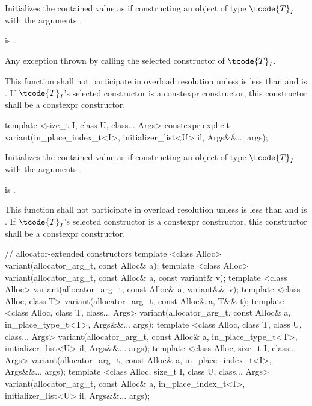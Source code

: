 \begin{itemdescr}
\pnum
\effects
Initializes the contained value as if constructing an object of type $\tcode{T}_I$
with the arguments .

\pnum
\postconditions
{} is .

\pnum
\throws
Any exception thrown by calling the selected constructor of $\tcode{T}_I$.

\pnum
\remarks
This function shall not participate in overload resolution unless  is
less than  and  is .
If $\tcode{T}_I$'s selected constructor is a constexpr constructor, this
constructor shall be a constexpr constructor.
\end{itemdescr}

%
\begin{itemdecl}
template <size_t I, class U, class... Args>
  constexpr explicit variant(in_place_index_t<I>, initializer_list<U> il, Args&&... args);
\end{itemdecl}

\begin{itemdescr}
\pnum
\effects
Initializes the contained value as if constructing an object of type
$\tcode{T}_I$ with the arguments .

\pnum
\postconditions
{} is .

\pnum
\remarks
This function shall not participate in overload resolution unless  is
less than  and
 is .
If $\tcode{T}_I$'s selected constructor is a constexpr constructor, this
constructor shall be a constexpr constructor.
\end{itemdescr}

%
\begin{itemdecl}
// allocator-extended constructors
template <class Alloc>
  variant(allocator_arg_t, const Alloc& a);
template <class Alloc>
  variant(allocator_arg_t, const Alloc& a, const variant& v);
template <class Alloc>
  variant(allocator_arg_t, const Alloc& a, variant&& v);
template <class Alloc, class T>
  variant(allocator_arg_t, const Alloc& a, T&& t);
template <class Alloc, class T, class... Args>
  variant(allocator_arg_t, const Alloc& a, in_place_type_t<T>, Args&&... args);
template <class Alloc, class T, class U, class... Args>
  variant(allocator_arg_t, const Alloc& a, in_place_type_t<T>,
          initializer_list<U> il, Args&&... args);
template <class Alloc, size_t I, class... Args>
  variant(allocator_arg_t, const Alloc& a, in_place_index_t<I>, Args&&... args);
template <class Alloc, size_t I, class U, class... Args>
  variant(allocator_arg_t, const Alloc& a, in_place_index_t<I>,
          initializer_list<U> il, Args&&... args);
\end{itemdecl}

